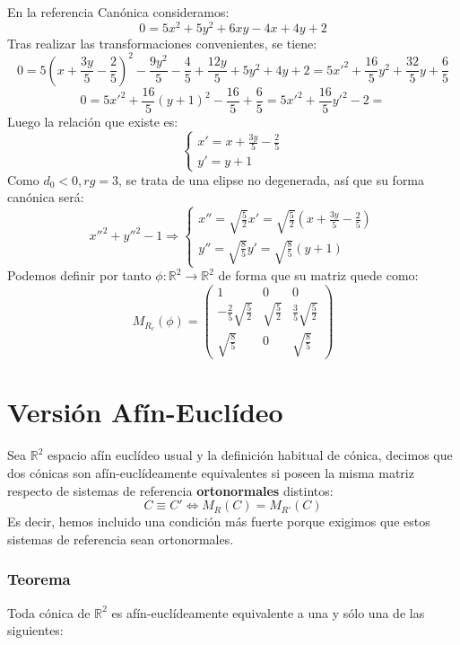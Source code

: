 \documentclass[10pt,a4paper,openright]{book}
\theoremstyle{break}
\begin{document}
En la referencia Canónica consideramos:
$$0 = 5x^2 + 5y^2 + 6xy - 4x + 4y + 2$$
Tras realizar las transformaciones convenientes, se tiene:
$$0 =5 (x + \frac{3y}{5} - \frac{2}{5})^2 - \frac{9y^2}{5} - \frac{4}{5} + \frac{12y}{5} + 5y^2 + 4y + 2 = 5x'^2 + \frac{16}{5} y^2 + \frac{32}{5} y + \frac{6}{5}$$
$$0 = 5x'^2 + \frac{16}{5} (y + 1)^2 - \frac{16}{5} + \frac{6}{5} = 5x'^2 + \frac{16}{5} y'^2 - 2 = $$
Luego la relación que existe es:
$$\begin{cases} x' = x + \frac{3y}{5} - \frac{2}{5} \\ y' = y + 1 \end{cases}$$
Como $ d_0 < 0, rg = 3$, se trata de una elipse no degenerada, así que su forma canónica será:
$$x''^2 + y''^2 - 1 \Rightarrow \begin{cases} x'' = \sqrt{\frac{5}{2}} x' =  \sqrt{\frac{5}{2}} (x + \frac{3y}{5} - \frac{2}{5})  \\ y'' = \sqrt{\frac{8}{5}} y' = \sqrt{\frac{8}{5}} (y+1)\end{cases}$$
Podemos definir por tanto $\phi : \mathbb{R}^2 \to  \mathbb{R}^2$ de forma que su matriz quede como:
$$M_{R_c} (\phi)= \left(\begin{array}{c|cc}
1 & 0 & 0 \\
\hline
- \frac{2}{5}\sqrt{\frac{5}{2}}  & \sqrt{\frac{5}{2}}  & \frac{3}{5}\sqrt{\frac{5}{2}}  \\
\sqrt{\frac{8}{5}} &  0 & \sqrt{\frac{8}{5}}
\end{array}
\right) $$

\section{Versión Afín-Euclídeo}
Sea $\mathbb{R}^2$ espacio afín euclídeo usual y la definición habitual de cónica, decimos que dos cónicas son afín-euclídeamente equivalentes si poseen la misma matriz respecto de sistemas de referencia \textbf{ortonormales} distintos:
$$C \equiv C' \Leftrightarrow M_R(C) = M_{R'} (C)$$
Es decir, hemos incluido una condición más fuerte porque exigimos que estos sistemas de referencia sean ortonormales.

\subsubsection*{Teorema}
Toda cónica de $\mathbb{R}^2$ es afín-euclídeamente equivalente a una y sólo una de las siguientes:
\end{document}
